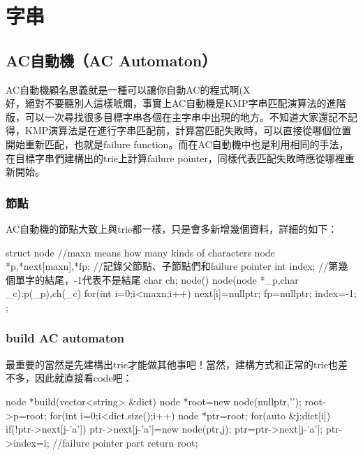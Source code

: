 \chapter{字串\uppercase\expandafter{}}
\section{AC自動機（AC Automaton）}
AC自動機顧名思義就是一種可以讓你自動AC的程式啊(X\\

好，絕對不要聽別人這樣唬爛，事實上AC自動機是KMP字串匹配演算法的進階版，可以一次尋找很多目標字串各個在主字串中出現的地方。不知道大家還記不記得，KMP演算法是在進行字串匹配前，計算當匹配失敗時，可以直接從哪個位置開始重新匹配，也就是failure function。而在AC自動機中也是利用相同的手法，在目標字串們建構出的trie上計算failure pointer，同樣代表匹配失敗時應從哪裡重新開始。
\subsection{節點}
AC自動機的節點大致上與trie都一樣，只是會多新增幾個資料，詳細的如下：
\begin{C++}
struct node{ //maxn means how many kinds of characters
	node *p,*next[maxn],*fp; //記錄父節點、子節點們和failure pointer
    int index; //第幾個單字的結尾，-1代表不是結尾
    char ch;
    node(){}
    node(node *_p,char _c):p(_p),ch(_c){
        for(int i=0;i<maxn;i++) next[i]=nullptr;
        fp=nullptr; index=-1;
    }
};
\end{C++}
\subsection{build AC automaton}
最重要的當然是先建構出trie才能做其他事吧！當然，建構方式和正常的trie也差不多，因此就直接看code吧：
\begin{C++}
node *build(vector<string> &dict){
    node *root=new node(nullptr,'\0');
    root->p=root;
    for(int i=0;i<dict.size();i++){
        node *ptr=root;
        for(auto &j:dict[i]){
            if(!ptr->next[j-'a'])
                ptr->next[j-'a']=new node(ptr,j);
            ptr=ptr->next[j-'a'];
        }
        ptr->index=i;
    }
    //failure pointer part
    return root;
}
\end{C++}
